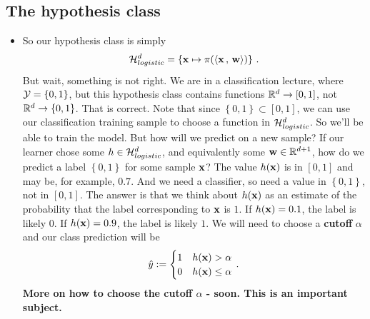   \subsection{The hypothesis class}
  \begin{itemize}
    \item So our hypothesis class is simply 
      \[
	\mathcal{H}_{logistic}^d= \left\{ \mathbf{x} \mapsto \pi({\left\langle \mathbf{x}\,,\,\mathbf{w} \right\rangle} ) \right\}\,.
      \]
      But wait, something is not right.  We are in a classification lecture, where
      $\mathcal{Y}=\left\{ 0,1 \right\}$, but this hypothesis class contains functions 
      $\mathbb{R}^d \to [0,1]$, not $\mathbb{R}^d \to \left\{ 0,1 \right\}$. That is
      correct. Note that since $\left\{ 0,1 \right\}\subset [0,1]$, we can use
      our classification training sample to choose a function in
      $\mathcal{H}_{logistic}^d$. So we'll
      be able to train the model. But how will we 
      predict on a new sample? If our learner chose some $h\in\mathcal{H}_{logistic}^d$, and
      equivalently some $\mathbf{w}\in \mathbb{R}^{d+1}$, how do we predict a label
      $\left\{ 0,1 \right\}$ for some sample $\mathbf{x}$? The value $h(\mathbf{x})$ is in
      $[0,1]$ and may be, for example, $0.7$. And we need a classifier, so need
      a value in $\left\{ 0,1 \right\}$, not in $[0,1]$.
      The answer is that we think about $h(\mathbf{x})$ as an estimate of the
      probability that the label corresponding to $\mathbf{x}$  is $1$. If
      $h(\mathbf{x})=0.1$, the label is likely $0$. If $h(\mathbf{x})=0.9$, the label is
      likely $1$. We will need to choose a {\bf cutoff} $\alpha$ and our class
      prediction will be 
      \[\hat{y} := \begin{cases} 1 & h(\mathbf{x})>\alpha \\ 0 &
      h(\mathbf{x}) \leq \alpha \end{cases}\,.\]
      {\bf More on how to choose the cutoff $\alpha$ - 
      soon. This is an important subject.}
      \end{itemize}
